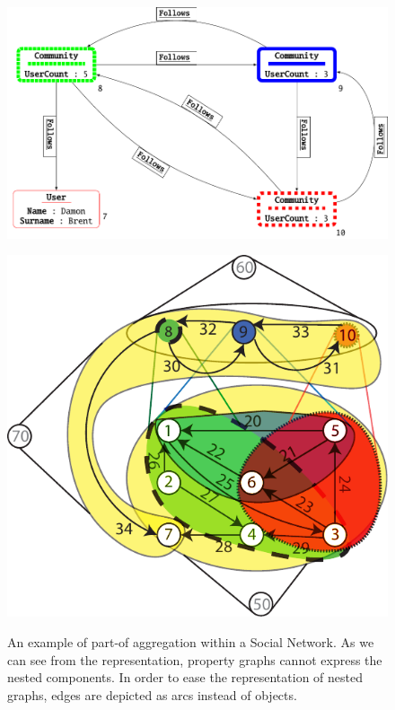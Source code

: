 \begin{figure}[!hp]
	\begin{minipage}[t]{0.45\textwidth}
		\includegraphics[width=\textwidth]{fig/04model/ex01_06}
		\label{fig:ex0106}
	\end{minipage}\quad \begin{minipage}[t]{0.45\textwidth}
		\includegraphics[width=\textwidth]{fig/04model/0603aggregation}
		\label{fig:ex0105}
	\end{minipage}
	\caption{An example of part-of aggregation within a Social Network. As we can see from the representation, property graphs cannot express the nested components. In order to ease the representation of nested graphs, edges are depicted as arcs instead of objects.}
\end{figure}


